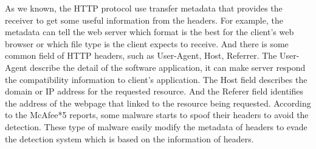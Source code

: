 As we known, the HTTP protocol use transfer metadata that provides the receiver to get some useful information from the headers. For example, the metadata can tell the web server which format is the best for the client's web browser or which file type is the client expects to receive.  And there is some common field of HTTP headers, such as User-Agent, Host, Referrer. The User-Agent describe the detail of the software application, it can make server respond the compatibility information to client's application. The Host field describes the domain or IP address for the requested resource. And the Referer field identifies the address of the webpage that linked to the resource being requested. According to the McAfee*5 reports, some malware starts to spoof their headers to avoid the detection.  These type of malware easily modify the metadata of headers to evade the detection system which is based on the information of headers. 